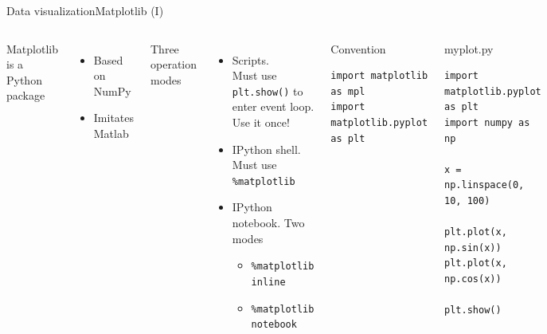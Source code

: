 \documentclass[10pt,compress]{beamer} %
\begin{document}
\begin{frame}[fragile]{Data visualization}{Matplotlib (I)}
	\begin{columns}
	Matplotlib is a Python package
	\begin{itemize}
		\item Based on NumPy
		\item Imitates Matlab
	\end{itemize}
	Three operation modes
	\begin{itemize}
		\item Scripts. \\Must use \texttt{plt.show()} to enter event loop. Use it once!
		\item IPython shell. \\Must use \texttt{\%matplotlib}
		\item IPython notebook. Two modes
		\begin{itemize}
			\item \texttt{\%matplotlib inline}
			\item \texttt{\%matplotlib notebook}
		\end{itemize}
	\end{itemize}

	\begin{block}{\footnotesize{Convention}}
	\vspace{-0.2cm} 
	\begin{lstlisting}
import matplotlib as mpl
import matplotlib.pyplot as plt
\end{lstlisting}
	\vspace{-0.2cm} 
	\end{block}

	\begin{exampleblock}{\footnotesize{myplot.py}}
	\vspace{-0.2cm} 
	\begin{lstlisting}
import matplotlib.pyplot as plt
import numpy as np

x = np.linspace(0, 10, 100)

plt.plot(x, np.sin(x))
plt.plot(x, np.cos(x))

plt.show()
\end{lstlisting}
	\vspace{-0.2cm} 
	\end{exampleblock}

	\end{columns}
\end{frame}
\end{document}
